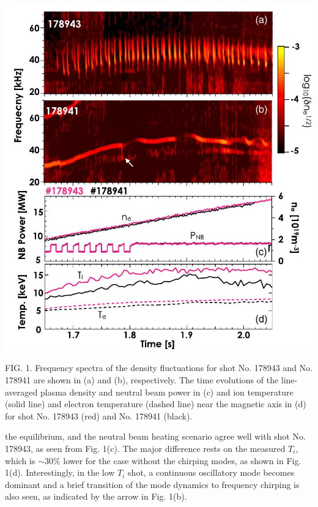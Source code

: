 \documentclass[10pt]{article}
\begin{document}
\begin{center}
\includegraphics[max width=\textwidth]{2023_06_19_f8dbb752866ca158c73eg-2(1)}
\end{center}

FIG. 1. Frequency spectra of the density fluctuations for shot No. 178943 and No. 178941 are shown in (a) and (b), respectively. The time evolutions of the line-averaged plasma density and neutral beam power in (c) and ion temperature (solid line) and electron temperature (dashed line) near the magnetic axis in (d) for shot No. 178943 (red) and No. 178941 (black).

the equilibrium, and the neutral beam heating scenario agree well with shot No. 178943, as seen from Fig. 1(c). The major difference rests on the measured $T_{i}$, which is $\sim 30 \%$ lower for the case without the chirping modes, as shown in Fig. 1(d). Interestingly, in the low $T_{i}$ shot, a continuous oscillatory mode becomes dominant and a brief transition of the mode dynamics to frequency chirping is also seen, as indicated by the arrow in Fig. 1(b).
\end{document}
